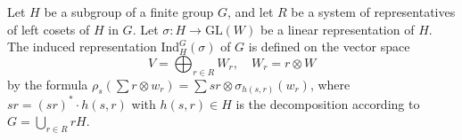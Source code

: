 Let $H$ be a subgroup of a finite group $G$, and let $R$ be a system of representatives of left cosets of $H$ in $G$.
Let $\sigma: H \to \mathrm{GL}(W)$ be a linear representation of $H$.
The induced representation $\mathrm{Ind}_H^G(\sigma)$ of $G$ is defined on the vector space
$$V = \bigoplus_{r \in R} W_r, \quad W_r = r \otimes W$$
by the formula $\rho_s(\sum r \otimes w_r) = \sum sr \otimes \sigma_{h(s,r)}(w_r)$, where $sr = (sr)^* \cdot h(s,r)$ with $h(s,r) \in H$ is the decomposition according to $G = \bigcup_{r \in R} rH$.
